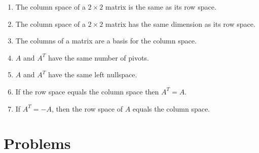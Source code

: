 \documentclass[11pt]{article}
\begin{document}
\begin{enumerate}
\begin{enumerate}
\item The column space of a $2 \times 2$ matrix is the same as its row space.

\item The column space of a $2 \times 2$ matrix has the same dimension as its row space.

\item The columns of a matrix are a basis for the column space.

\item $A$ and $A^T$ have the same number of pivots.

\item $A$ and $A^T$ have the same left nullspace.

\item If the row space equals the column space then $A^T=A$.

\item If $A^T = -A$, then the row space of $A$ equals the column space.

\end{enumerate}

\end{enumerate}

\section{Problems}
\end{document}
